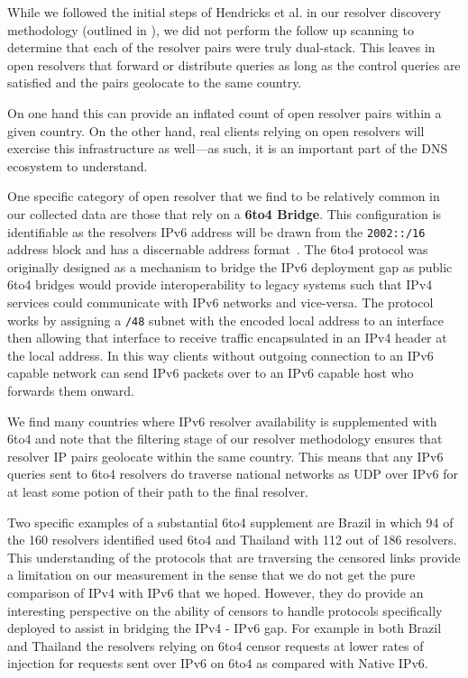 While we followed the initial steps of Hendricks et al. in our resolver
discovery methodology (outlined in ), we did not
perform the follow up scanning to determine that each of the resolver pairs were
truly dual-stack. This leaves in open resolvers that forward or distribute
queries as long as the control queries are satisfied and the pairs geolocate to
the same country.

On one hand this can provide an inflated count of open resolver pairs within a
given country. On the other hand, real clients relying on open resolvers will
exercise this infrastructure as well---as such, it is an important part of the
DNS ecosystem to understand.

One specific category of open resolver that we find to be relatively common in
our collected data are those that rely on a \textbf{6to4 Bridge}. This
configuration is identifiable as the resolvers IPv6 address will be drawn from
the \texttt{2002::/16} address block and has a discernable address
format~\cite{RFC3056}. The 6to4 protocol was originally designed as a mechanism
to bridge the IPv6 deployment gap as public 6to4 bridges would provide
interoperability to legacy systems such that IPv4 services could communicate
with IPv6 networks and vice-versa. The protocol works by assigning a
\texttt{/48} subnet with the encoded local address to an interface
then allowing that interface to receive traffic encapsulated in an IPv4 header
at the local address. In this way clients without outgoing connection to an IPv6
capable network can send IPv6 packets over to an IPv6 capable host who forwards
them onward.

We find many countries where IPv6 resolver availability is supplemented with
6to4 and note that the filtering stage of our resolver methodology ensures that
resolver IP pairs geolocate within the same country. This means that any IPv6
queries sent to 6to4 resolvers do traverse national networks as UDP over IPv6
for at least some potion of their path to the final resolver.

Two specific examples of a substantial 6to4 supplement are Brazil in which 94 of
the 160 resolvers identified used 6to4 and Thailand with 112 out of 186
resolvers. This understanding of the protocols that are traversing the censored
links provide a limitation on our measurement in the sense that we do not get
the pure comparison of IPv4 with IPv6 that we hoped. However, they do provide an
interesting perspective on the ability of censors to handle protocols
specifically deployed to assist in bridging the IPv4 - IPv6 gap. For example in
both Brazil and Thailand the resolvers relying on 6to4 censor requests at lower
rates of injection for requests sent over IPv6 on 6to4 as compared with Native
IPv6.

